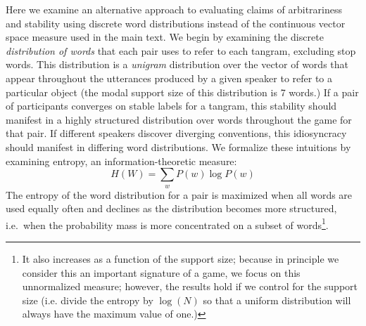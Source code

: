 \documentclass[alpha-refs]{wiley-article}
\begin{document}
Here we examine an alternative approach to evaluating claims of arbitrariness 
 and stability using discrete word distributions instead of the continuous vector space measure used in the main text.
We begin by examining the discrete \emph{distribution of words} that each pair uses to refer to each tangram, excluding stop words.
This distribution is a \emph{unigram} distribution over the vector of words that appear throughout the utterances produced by a given speaker to refer to a particular object (the modal support size of this distribution is 7 words.)
If a pair of participants converges on stable labels for a tangram, this stability should manifest in a highly structured distribution over words throughout the game for that pair.
If different speakers discover diverging conventions, this idiosyncracy should manifest in differing word distributions.
We formalize these intuitions by examining entropy, an information-theoretic measure: $$H(W) = \sum_w P(w) \log P(w)$$
The entropy of the word distribution for a pair is maximized when all words are used equally often and declines as the distribution becomes more structured, i.e.~when the probability mass is more concentrated on a subset of words\footnote{It also increases as a function of the support size; because in principle we consider this an important signature of a game, we focus on this unnormalized measure; however, the results hold if we control for the support size (i.e. divide the entropy by $\log(N)$ so that a uniform distribution will always have the maximum value of one.)}.
\end{document}
